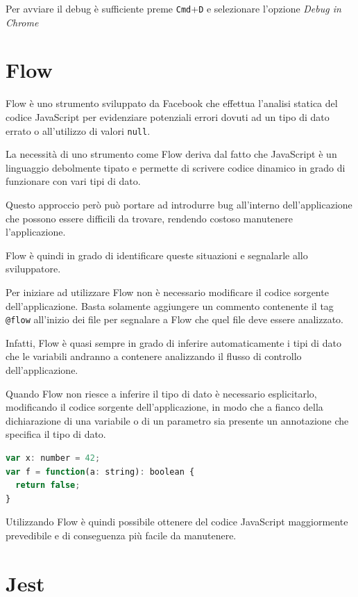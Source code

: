 Per avviare il debug è sufficiente preme \texttt{Cmd}+\texttt{D} e selezionare l'opzione \textit{Debug in Chrome}
\FloatBarrier
\section{Flow}

Flow è uno strumento sviluppato da Facebook che effettua l'analisi statica del codice JavaScript per evidenziare potenziali errori dovuti ad un tipo di dato errato o all'utilizzo di valori \texttt{null}.

La necessità di uno strumento come Flow deriva dal fatto che JavaScript è un linguaggio debolmente tipato e permette di scrivere codice dinamico in grado di funzionare con vari tipi di dato.

Questo approccio però può portare ad introdurre bug all'interno dell'applicazione che possono essere difficili da trovare, rendendo costoso manutenere l'applicazione.

Flow è quindi in grado di identificare queste situazioni e segnalarle allo sviluppatore.

Per iniziare ad utilizzare Flow non è necessario modificare il codice sorgente dell'applicazione. Basta solamente aggiungere un commento contenente il tag \texttt{@flow} all'inizio dei file per segnalare a Flow che quel file deve essere analizzato.

Infatti, Flow è quasi sempre in grado di inferire automaticamente i tipi di dato che le variabili andranno a contenere analizzando il flusso di controllo dell'applicazione.

Quando Flow non riesce a inferire il tipo di dato è necessario esplicitarlo, modificando il codice sorgente dell'applicazione, in modo che a fianco della dichiarazione di una variabile o di un parametro sia presente un annotazione che specifica il tipo di dato.

\begin{lstlisting}[language=JavaScript, caption=Esempio della notazione di Flow]
var x: number = 42;
var f = function(a: string): boolean {
  return false;
}
\end{lstlisting}

Utilizzando Flow è quindi possibile ottenere del codice JavaScript maggiormente prevedibile e di conseguenza più facile da manutenere.

\section{Jest}

